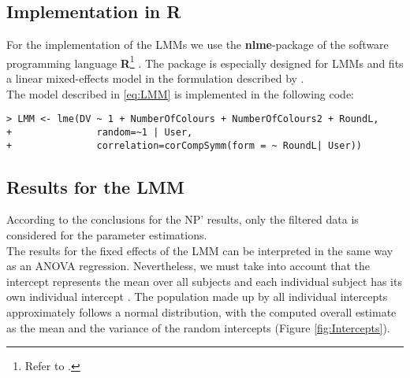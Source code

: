 \subsection{Implementation in R}

For the implementation of the \ac{LMM}s we use the \textbf{nlme}-package of the software programming language \textbf{R}\footnote{Refer to \cite{R2012}.} . The package is especially designed for \ac{LMM}s  \citep{Pinheiro2013} and fits a linear mixed-effects model in the formulation described by \cite{Laird1982}.\\
The model described in \ref{eq:LMM} is implemented in the following code:
\begin{verbatim}
> LMM <- lme(DV ~ 1 + NumberOfColours + NumberOfColours2 + RoundL, 
+               random=~1 | User, 
+               correlation=corCompSymm(form = ~ RoundL| User))
\end{verbatim}

\subsection{Results for the \ac{LMM}}

According to the conclusions for the \acl{NP}' results, only the filtered data is considered for the parameter estimations.\\
The results for the fixed effects of the \ac{LMM} can be interpreted in the same way as an ANOVA regression. Nevertheless, we must take into account that the intercept represents the mean over all subjects and each individual subject has its own individual intercept \citep{Seltman2012}. The population made up by all individual intercepts approximately follows a normal distribution, with the computed overall estimate as the mean and the variance of the random intercepts (Figure \ref{fig:Intercepts}).

